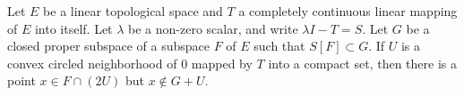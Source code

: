 Let $E$ be a linear topological space and $T$ a completely continuous linear mapping of $E$ into itself. Let $\lambda$ be a non-zero scalar, and write $\lambda I - T = S$. Let $G$ be a closed proper subspace of a subspace $F$ of $E$ such that $S[F] \subset G$. If $U$ is a convex circled neighborhood of $0$ mapped by $T$ into a compact set, then there is a point $x \in F \cap (2U)$ but $x \notin G + U$.
